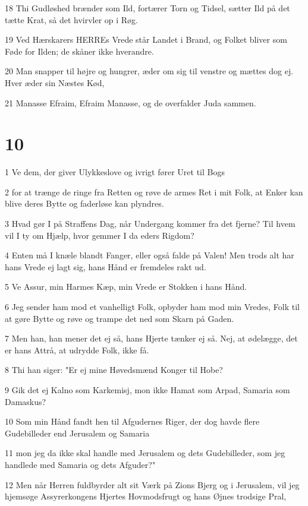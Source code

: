\par 18 Thi Gudløshed brænder som Ild, fortærer Torn og Tidsel, sætter Ild på det tætte Krat, så det hvirvler op i Røg.
\par 19 Ved Hærskarers HERREs Vrede står Landet i Brand, og Folket bliver som Føde for Ilden; de skåner ikke hverandre.
\par 20 Man snapper til højre og hungrer, æder om sig til venstre og mættes dog ej. Hver æder sin Næstes Kød,
\par 21 Manasse Efraim, Efraim Manasse, og de overfalder Juda sammen.

\chapter{10}

\par 1 Ve dem, der giver Ulykkeslove og ivrigt fører Uret til Bogs
\par 2 for at trænge de ringe fra Retten og røve de armes Ret i mit Folk, at Enker kan blive deres Bytte og faderløse kan plyndres.
\par 3 Hvad gør I på Straffens Dag, når Undergang kommer fra det fjerne? Til hvem vil I ty om Hjælp, hvor gemmer I da eders Rigdom?
\par 4 Enten må I knæle blandt Fanger, eller også falde på Valen! Men trods alt har hans Vrede ej lagt sig, hans Hånd er fremdeles rakt ud.
\par 5 Ve Assur, min Harmes Kæp, min Vrede er Stokken i hans Hånd.
\par 6 Jeg sender ham mod et vanhelligt Folk, opbyder ham mod min Vredes, Folk til at gøre Bytte og røve og trampe det ned som Skarn på Gaden.
\par 7 Men han, han mener det ej så, hans Hjerte tænker ej så. Nej, at ødelægge, det er hans Attrå, at udrydde Folk, ikke få.
\par 8 Thi han siger: "Er ej mine Høvedsmænd Konger til Hobe?
\par 9 Gik det ej Kalno som Karkemisj, mon ikke Hamat som Arpad, Samaria som Damaskus?
\par 10 Som min Hånd fandt hen til Afgudernes Riger, der dog havde flere Gudebilleder end Jerusalem og Samaria
\par 11 mon jeg da ikke skal handle med Jerusalem og dets Gudebilleder, som jeg handlede med Samaria og dets Afguder?"
\par 12 Men når Herren fuldbyrder alt sit Værk på Zions Bjerg og i Jerusalem, vil jeg hjemsøge Assyrerkongens Hjertes Hovmodsfrugt og hans Øjnes trodsige Pral,
